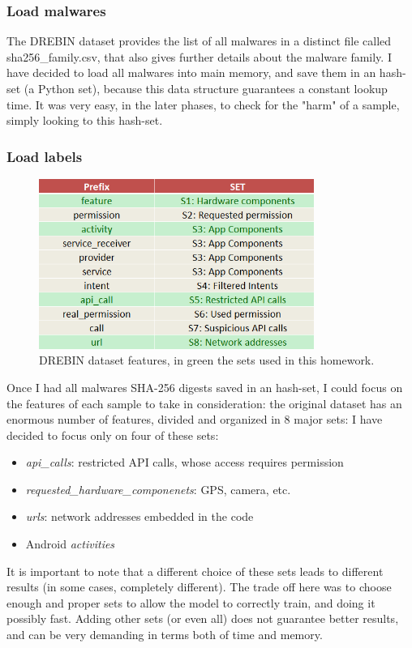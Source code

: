 \documentclass[12pt]{article}
\begin{document}
\subsubsection{Load malwares}
The DREBIN dataset provides the list of all malwares in a distinct file called sha256\_family.csv, that also gives further details about the malware family.  I have decided to load all malwares into main memory, and save them in an hash-set (a Python set), because this data structure guarantees a constant lookup time. It was very easy, in the later phases, to check for the "harm" of a sample, simply looking to this hash-set. 

\subsubsection{Load labels}
\begin{figure}[!ht]
	\centering %
	\includegraphics[width=0.8\textwidth]{features.png} %
	\caption{DREBIN dataset features, in green the sets used in this homework.} 
	\label{fig:features}
\end{figure}
Once I had all malwares SHA-256 digests saved in an hash-set, I could focus on the features of each sample to take in consideration: the original dataset has an enormous number of features, divided and organized in 8 major sets: I have decided to focus only on four of these sets:
\begin{itemize}
	\item \textit{api\_calls}: restricted API calls, whose access requires permission
	\item \textit{requested\_hardware\_componenets}: GPS, camera, etc.
	\item \textit{urls}: network addresses embedded in the code
	\item Android \textit{activities}  
\end{itemize}
It is important to note that a different choice of these sets leads to different results (in some cases, completely different). The trade off here was to choose enough and proper sets to allow the model to correctly train, and doing it possibly fast. Adding other sets (or even all) does not guarantee better results, and can be very demanding in terms both of time and memory.
\end{document}
